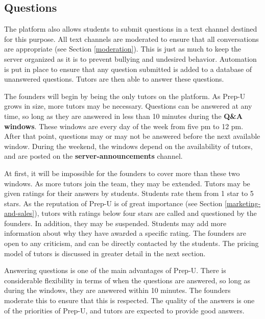 \documentclass{business}
\begin{document}
    \subsection{Questions}
    The platform also allows students to submit questions in a text channel destined for this purpose. All text channels are moderated to ensure that all conversations are appropriate (see Section \ref{moderation}). This is just as much to keep the server organized as it is to prevent bullying and undesired behavior. Automation is put in place to ensure that any question submitted is added to a database of unanswered questions. Tutors are then able to answer these questions.\par
    The founders will begin by being the only tutors on the platform. As Prep-U grows in size, more tutors may be necessary. Questions can be answered at any time, so long as they are answered in less than 10 minutes during the \textbf{Q\&A windows}. These windows are every day of the week from five pm to 12 pm. After that point, questions may or may not be answered before the next available window. During the weekend, the windows depend on the availability of tutors, and are posted on the \textbf{server-announcements} channel. \par
    At first, it will be impossible for the founders to cover more than these two windows. As more tutors join the team, they may be extended. Tutors may be given ratings for their answers by students. Students rate them from 1 star to 5 stars. As the reputation of Prep-U is of great importance (see Section \ref{marketing-and-sales}), tutors with ratings below four stars are called and questioned by the founders. In addition, they may be suspended. Students may add more information about why they have  awarded a specific rating. The founders are open to any criticism, and can be directly contacted by the students. The pricing model of tutors is discussed in greater detail in the next section.\par
    Answering questions is one of the main advantages of Prep-U. There is considerable flexibility in terms of when the questions are answered, so long as during the windows, they are answered within 10 minutes. The founders moderate this to ensure that this is respected. The quality of the answers is one of the priorities of Prep-U, and tutors are expected to provide good answers. 
\end{document}
